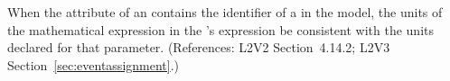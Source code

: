 When the  attribute of an \EventAssignment
contains the identifier of a \Parameter in the model, the
units of the mathematical expression in the
\EventAssignment's  expression  be
consistent with the units declared for that parameter.
(References: L2V2 Section~4.14.2; L2V3 Section~\ref{sec:eventassignment}.)
